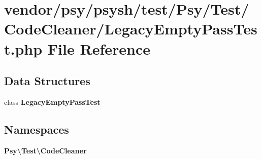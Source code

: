 \section{vendor/psy/psysh/test/\+Psy/\+Test/\+Code\+Cleaner/\+Legacy\+Empty\+Pass\+Test.php File Reference}
\label{_legacy_empty_pass_test_8php}
\subsection*{Data Structures}
\begin{DoxyCompactItemize}
\item 
class {\bf Legacy\+Empty\+Pass\+Test}
\end{DoxyCompactItemize}
\subsection*{Namespaces}
\begin{DoxyCompactItemize}
\item 
 {\bf Psy\textbackslash{}\+Test\textbackslash{}\+Code\+Cleaner}
\end{DoxyCompactItemize}
